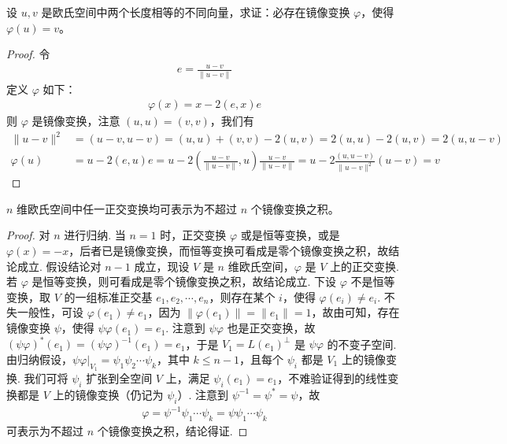 \documentclass[../../main.tex]{subfiles}
\begin{document}
\begin{proposition}\label{proposition:例9.42}
设 \(u,v\) 是欧氏空间中两个长度相等的不同向量，求证：必存在镜像变换 \(\varphi\)，使得 \(\varphi(u) = v\)。
\end{proposition}
\begin{proof}
令
\begin{align*}
e = \frac{u - v}{\|u - v\|}
\end{align*}
定义 \(\varphi\) 如下：
\begin{align*}
\varphi(x) = x - 2(e,x)e
\end{align*}
则 \(\varphi\) 是镜像变换，注意 \((u,u) = (v,v)\)，我们有
\begin{align*}
\|u - v\|^2 &= (u - v,u - v) = (u,u) + (v,v) - 2(u,v) = 2(u,u) - 2(u,v) = 2(u,u - v)\\
\varphi(u) &= u - 2(e,u)e = u - 2\left(\frac{u - v}{\|u - v\|},u\right)\frac{u - v}{\|u - v\|} = u - 2\frac{(u,u - v)}{\|u - v\|^2}(u - v) = v
\end{align*}

\end{proof}

\begin{proposition}\label{proposition:例9.43}
\(n\) 维欧氏空间中任一正交变换均可表示为不超过 \(n\) 个镜像变换之积。
\end{proposition}
\begin{proof}
对 \(n\) 进行归纳. 当 \(n = 1\) 时，正交变换 \(\varphi\) 或是恒等变换，或是 \(\varphi(x) = -x\)，后者已是镜像变换，而恒等变换可看成是零个镜像变换之积，故结论成立. 假设结论对 \(n - 1\) 成立，现设 \(V\) 是 \(n\) 维欧氏空间，\(\varphi\) 是 \(V\) 上的正交变换. 若 \(\varphi\) 是恒等变换，则可看成是零个镜像变换之积，故结论成立. 下设 \(\varphi\) 不是恒等变换，取 \(V\) 的一组标准正交基 \(e_1,e_2,\cdots,e_n\)，则存在某个 \(i\)，使得 \(\varphi(e_i) \neq e_i\). 不失一般性，可设 \(\varphi(e_1) \neq e_1\)，因为 \(\|\varphi(e_1)\| = \|e_1\| = 1\)，故由可知，存在镜像变换 \(\psi\)，使得 \(\psi\varphi(e_1) = e_1\). 注意到 \(\psi\varphi\) 也是正交变换，故 \((\psi\varphi)^*(e_1) = (\psi\varphi)^{-1}(e_1) = e_1\)，于是 \(V_1 = L(e_1)^{\perp}\) 是 \(\psi\varphi\) 的不变子空间. 由归纳假设，\(\psi\varphi|_{V_1} = \psi_1\psi_2\cdots\psi_k\)，其中 \(k \leqslant  n - 1\)，且每个 \(\psi_i\) 都是 \(V_1\) 上的镜像变换. 我们可将 \(\psi_i\) 扩张到全空间 \(V\) 上，满足 \(\psi_i(e_1) = e_1\)，不难验证得到的线性变换都是 \(V\) 上的镜像变换（仍记为 \(\psi_i\)）. 注意到 \(\psi^{-1} = \psi^* = \psi\)，故
\begin{align*}
\varphi = \psi^{-1}\psi_1\cdots\psi_k = \psi\psi_1\cdots\psi_k
\end{align*}
可表示为不超过 \(n\) 个镜像变换之积，结论得证. 

\end{proof}
\end{document}
